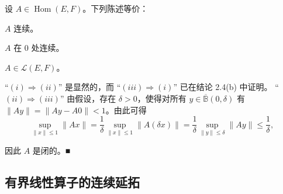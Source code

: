 \begin{theorem}

设 $ A \in \operatorname{Hom}(E, F) $。下列陈述等价：

\begin{subitems}
\item

$ A $ 连续。

\item

$ A $ 在 0 处连续。

\item

$ A \in \mathcal{L}(E, F) $。

\proofhead
“$ (i) \Longrightarrow (ii) $” 是显然的，而 “$ (iii) \Longrightarrow (i) $” 已在结论 2.4(b) 中证明。
“$ (ii) \Longrightarrow (iii) $” 由假设，存在 $ \delta > 0 $，使得对所有 $ y \in \overline{\mathbb{B}}(0, \delta) $ 有 $ \|Ay\| = \|Ay - A0\| < 1 $。由此可得
\[
\sup_{\|x\| \le 1} \|Ax\| = \frac{1}{\delta} \sup_{\|x\| \le 1} \|A(\delta x)\| = \frac{1}{\delta} \sup_{\|y\| \le \delta} \|Ay\| \le \frac{1}{\delta},
\]

因此 $ A $ 是闭的。\nobreak\hspace{0.35em}■

\end{subitems}

\end{theorem}

\subsection*{有界线性算子的连续延拓}

